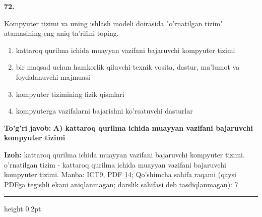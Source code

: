 \documentclass[10pt,a4paper]{article}
\begin{document}
{\bfseries\sffamily\color{ink} 72.}
\par
Kompyuter tizimi va uning ishlash modeli doirasida "o'rnatilgan tizim" atamasining eng aniq ta'rifini toping.
\begin{enumerate}[label=\Alph*),leftmargin=9mm]
\item kattaroq qurilma ichida muayyan vazifani bajaruvchi kompyuter tizimi
\item bir maqsad uchun hamkorlik qiluvchi texnik vosita, dastur, ma'lumot va foydalanuvchi majmuasi
\item kompyuter tizimining fizik qismlari
\item kompyuterga vazifalarni bajarishni ko'rsatuvchi dasturlar
\end{enumerate}
\begin{tcolorbox}[enhanced,breakable,colback=teal!4,colframe=teal!60!black,boxrule=0.45pt,arc=1.2mm,left=2.7mm,right=2.7mm,top=1.8mm,bottom=1.8mm,before skip=2mm,after skip=2mm]
{\bfseries\sffamily\color{teal}To'g'ri javob:} \textbf{A) kattaroq qurilma ichida muayyan vazifani bajaruvchi kompyuter tizimi}
\par\smallskip
{\bfseries Izoh:} kattaroq qurilma ichida muayyan vazifani bajaruvchi kompyuter tizimi. o'rnatilgan tizim - kattaroq qurilma ichida muayyan vazifani bajaruvchi kompyuter tizimi. Manba: ICT9, PDF 14; Qo'shimcha sahifa raqami (qaysi PDFga tegishli ekani aniqlanmagan; darslik sahifasi deb tasdiqlanmagan): 7
\end{tcolorbox}
\vspace{2mm}\hrule height 0.2pt\vspace{3mm}
\end{document}

